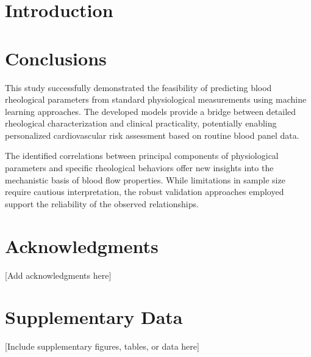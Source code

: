 \documentclass[12pt,letterpaper]{article}
\begin{document}

\section{Introduction}

\section{Conclusions}

This study successfully demonstrated the feasibility of predicting blood rheological parameters from standard physiological measurements using machine learning approaches. The developed models provide a bridge between detailed rheological characterization and clinical practicality, potentially enabling personalized cardiovascular risk assessment based on routine blood panel data.

The identified correlations between principal components of physiological parameters and specific rheological behaviors offer new insights into the mechanistic basis of blood flow properties. While limitations in sample size require cautious interpretation, the robust validation approaches employed support the reliability of the observed relationships.

\section{Acknowledgments}

[Add acknowledgments here]

\newpage
\printbibliography[title=References]

\newpage
\appendix

\section{Supplementary Data}
\label{app:supplementary}

[Include supplementary figures, tables, or data here]
\end{document}
